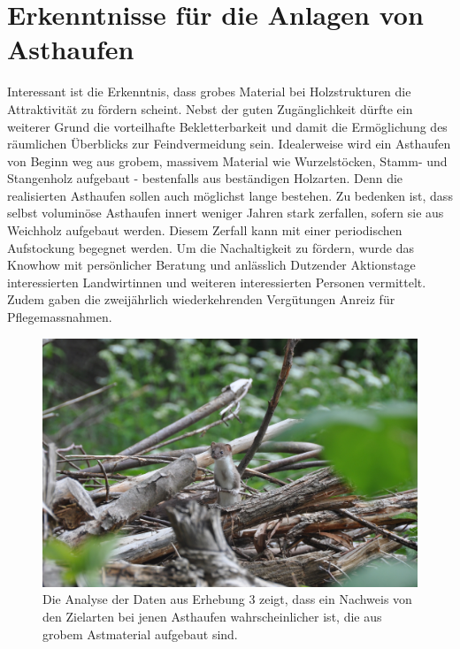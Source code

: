 \documentclass[
  oneside]{scrbook}
\begin{document}
\hypertarget{erkenntnisse-fuxfcr-die-anlagen-von-asthaufen}{%
\section{Erkenntnisse für die Anlagen von Asthaufen}\label{erkenntnisse-fuxfcr-die-anlagen-von-asthaufen}}

Interessant ist die Erkenntnis, dass grobes Material bei Holzstrukturen die Attraktivität zu fördern scheint. Nebst der guten Zugänglichkeit dürfte ein weiterer Grund die vorteilhafte Bekletterbarkeit und damit die Ermöglichung des räumlichen Überblicks zur Feindvermeidung sein.
Idealerweise wird ein Asthaufen von Beginn weg aus grobem, massivem Material wie Wurzelstöcken, Stamm- und Stangenholz aufgebaut - bestenfalls aus beständigen Holzarten. Denn die realisierten Asthaufen sollen auch möglichst lange bestehen. Zu bedenken ist, dass selbst voluminöse Asthaufen innert weniger Jahren stark zerfallen, sofern sie aus Weichholz aufgebaut werden. Diesem Zerfall kann mit einer periodischen Aufstockung begegnet werden.
Um die Nachaltigkeit zu fördern, wurde das Knowhow mit persönlicher Beratung und anlässlich Dutzender Aktionstage interessierten Landwirtinnen und weiteren interessierten Personen vermittelt. Zudem gaben die zweijährlich wiederkehrenden Vergütungen Anreiz für Pflegemassnahmen.

\begin{figure}
\includegraphics[width=20.83in]{images/hermelin_asthaufen_2} \caption{Die Analyse der Daten aus Erhebung 3 zeigt, dass ein Nachweis von den Zielarten bei jenen Asthaufen wahrscheinlicher ist, die aus grobem Astmaterial aufgebaut sind.}\label{fig:unnamed-chunk-11}
\end{figure}
\end{document}

